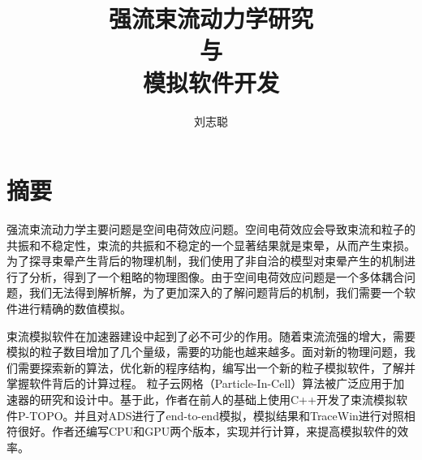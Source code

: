   \confidential{}%
  \title[强流束流动力学研究与模拟软件开发]{强流束流动力学研究\\与\\模拟软件开发}%
  \author{刘志聪}%
\maketitle
\makeenglishtitle
\makedeclaration
\chapter{摘\quad 要}%

强流束流动力学主要问题是空间电荷效应问题。空间电荷效应会导致束流和粒子的共振和不稳定性，束流的共振和不稳定的一个显著结果就是束晕，从而产生束损。为了探寻束晕产生背后的物理机制，我们使用了非自洽的模型对束晕产生的机制进行了分析，得到了一个粗略的物理图像。由于空间电荷效应问题是一个多体耦合问题，我们无法得到解析解，为了更加深入的了解问题背后的机制，我们需要一个软件进行精确的数值模拟。

束流模拟软件在加速器建设中起到了必不可少的作用。随着束流流强的增大，需要模拟的粒子数目增加了几个量级，需要的功能也越来越多。面对新的物理问题，我们需要探索新的算法，优化新的程序结构，编写出一个新的粒子模拟软件，了解并掌握软件背后的计算过程。
粒子云网格（Particle-In-Cell）算法被广泛应用于加速器的研究和设计中。基于此，作者在前人的基础上使用C++开发了束流模拟软件P-TOPO。并且对ADS进行了end-to-end模拟，模拟结果和TraceWin进行对照相符很好。作者还编写CPU和GPU两个版本，实现并行计算，来提高模拟软件的效率。

